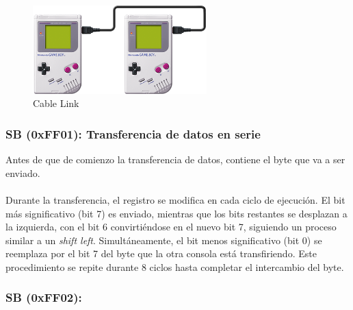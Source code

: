 \begin{figure}[H]
    \centering
    \includegraphics[width=0.6\textwidth]{include/images/link_cable.png}
    \caption{Cable Link}
    \label{figure:linkCable}
\end{figure}

\subsubsection{SB (0xFF01): Transferencia de datos en serie}

Antes de que de comienzo la transferencia de datos, contiene el byte que va a ser enviado.
\\\\
Durante la transferencia, el registro se modifica en cada ciclo de ejecución. El bit más significativo (bit 7) es enviado, mientras que los bits restantes se desplazan a la izquierda, con el bit 6 convirtiéndose en el nuevo bit 7, siguiendo un proceso similar a un \textit{shift left}. Simultáneamente, el bit menos significativo (bit 0) se reemplaza por el bit 7 del byte que la otra consola está transfiriendo. Este procedimiento se repite durante 8 ciclos hasta completar el intercambio del byte.

\subsubsection{SB (0xFF02): }

\cleardoublepage
